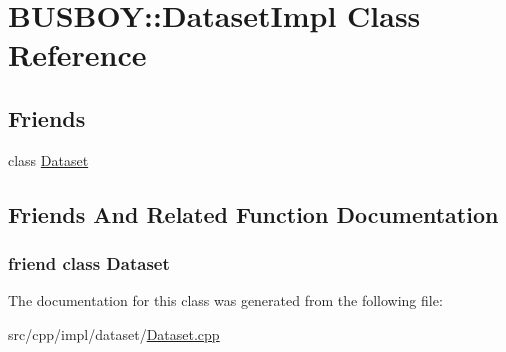 \hypertarget{classBUSBOY_1_1DatasetImpl}{
\section{BUSBOY::DatasetImpl Class Reference}
\label{classBUSBOY_1_1DatasetImpl}
}
\subsection*{Friends}
\begin{DoxyCompactItemize}
\item 
class \hyperlink{classBUSBOY_1_1DatasetImpl_ab93eacb81dea8d0c21041812e61f85ab}{Dataset}
\end{DoxyCompactItemize}


\subsection{Friends And Related Function Documentation}
\hypertarget{classBUSBOY_1_1DatasetImpl_ab93eacb81dea8d0c21041812e61f85ab}{
\subsubsection[{Dataset}]{\setlength{\rightskip}{0pt plus 5cm}friend class {\bf Dataset}}}
\label{classBUSBOY_1_1DatasetImpl_ab93eacb81dea8d0c21041812e61f85ab}


The documentation for this class was generated from the following file:\begin{DoxyCompactItemize}
\item 
src/cpp/impl/dataset/\hyperlink{Dataset_8cpp}{Dataset.cpp}\end{DoxyCompactItemize}
